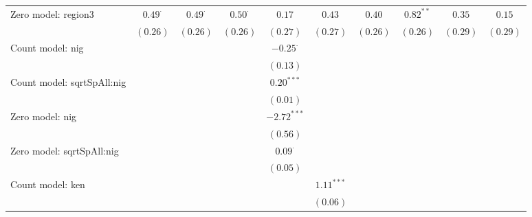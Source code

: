 \begin{table}
\begin{center}
{\begin{tabular}{l c c c c c c c c c}
Zero model: region3            & $0.49^{\cdot}$ & $0.49^{\cdot}$ & $0.50^{\cdot}$ & $0.17$          & $0.43$         & $0.40$          & $0.82^{**}$     & $0.35$          & $0.15$         \\
                               & $(0.26)$       & $(0.26)$       & $(0.26)$       & $(0.27)$        & $(0.27)$       & $(0.26)$        & $(0.26)$        & $(0.29)$        & $(0.29)$       \\
Count model: nig               &                &                &                & $-0.25^{\cdot}$ &                &                 &                 &                 &                \\
                               &                &                &                & $(0.13)$        &                &                 &                 &                 &                \\
Count model: sqrtSpAll:nig     &                &                &                & $0.20^{***}$    &                &                 &                 &                 &                \\
                               &                &                &                & $(0.01)$        &                &                 &                 &                 &                \\
Zero model: nig                &                &                &                & $-2.72^{***}$   &                &                 &                 &                 &                \\
                               &                &                &                & $(0.56)$        &                &                 &                 &                 &                \\
Zero model: sqrtSpAll:nig      &                &                &                & $0.09^{\cdot}$  &                &                 &                 &                 &                \\
                               &                &                &                & $(0.05)$        &                &                 &                 &                 &                \\
Count model: ken               &                &                &                &                 & $1.11^{***}$   &                 &                 &                 &                \\
                               &                &                &                &                 & $(0.06)$       &                 &                 &                 &                \\

\end{tabular}}
\end{center}
\end{table}
